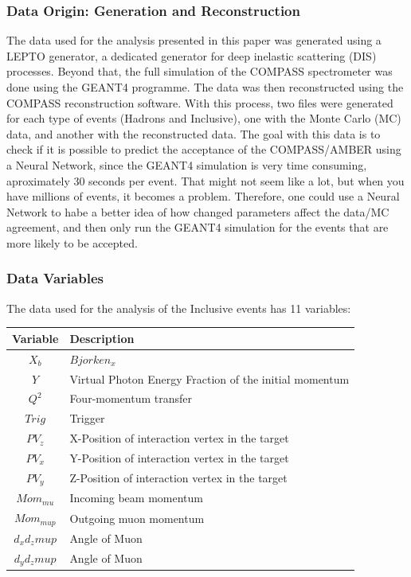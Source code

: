 \documentclass{article}
\begin{document}
\subsubsection*{Data Origin: Generation and Reconstruction}
The data used for the analysis presented in this paper was generated using a LEPTO generator,
a dedicated generator for deep inelastic scattering (DIS) processes. Beyond that, the full simulation
of the COMPASS spectrometer was done using the GEANT4 programme. The data was then reconstructed
using the COMPASS reconstruction software. With this process, two files were generated for each type of events (Hadrons and Inclusive), one with the
Monte Carlo (MC) data, and another with the reconstructed data. 
The goal with this data is to check if it is possible to predict the acceptance of the COMPASS/AMBER
using a Neural Network, since the GEANT4 simulation is very time consuming, aproximately 30 seconds per event.
That might not seem like a lot, but when you have millions of events, it becomes a problem.
Therefore, one could use a Neural Network to habe a better idea of how changed parameters affect the data/MC
agreement, and then only run the GEANT4 simulation for the events that are more likely to be accepted.


\subsubsection*{Data Variables}
The data used for the analysis of the Inclusive events has 11 variables:

\begin{table}[H]
    \centering
    \begin{tabular}{c|l}
    \textbf{Variable} & \textbf{Description} \\ \hline
    $X_b$ & $Bjorken_x$ \\
    $Y$ & Virtual Photon Energy Fraction of the initial momentum\\
    $Q^2$ & Four-momentum transfer \\
    $Trig$ & Trigger \\
    $PV_z$ & X-Position of interaction vertex in the target\\
    $PV_x$ & Y-Position of interaction vertex in the target\\
    $PV_y$ & Z-Position of interaction vertex in the target\\
    $Mom_{mu}$ & Incoming beam momentum\\
    $Mom_{mup}$ & Outgoing muon momentum\\
    $d_xd_zmup$ & Angle of Muon \\
    $d_yd_zmup$ & Angle of Muon \\
    \end{tabular}
\end{table}
\end{document}
